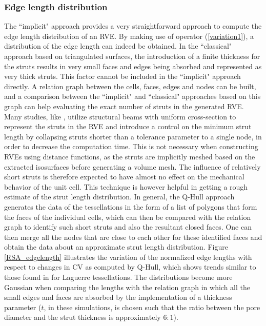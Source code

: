 \subsubsection{Edge length distribution}
The  ``implicit" approach provides a very straightforward approach to compute the edge length distribution of an RVE. By making use of operator (\ref{variation1}), a distribution of the edge length can indeed be obtained. In the ``classical" approach based on triangulated surfaces, the introduction of a finite thickness for the struts results in very small faces and edges being absorbed and represented as very thick struts. This factor cannot be included in the ``implicit" approach directly. A relation graph between the cells, faces, edges and nodes can be built, and a comparison between the ``implicit" and ``classical" approaches based on this graph can help evaluating the exact number of struts in the generated RVE. 
Many studies, like \cite{vanderburgLinearElasticProperties1997,kanaunMechanicalPropertiesOpen2006}, utilize structural beams with uniform cross-section to represent the struts in the RVE and introduce a control on the minimum strut length by collapsing struts shorter than a tolerance parameter to a single node, in order to decrease the computation time. This is not necessary when constructing RVEs using distance functions, as the struts are implicitly meshed based on the extracted isosurfaces before generating a volume mesh. The influence of relatively short struts is therefore expected to have almost no effect on the mechanical behavior of the unit cell. This technique is however helpful in getting a rough estimate of the strut length distribution. In general, the Q-Hull approach generates the data of the tessellations in the form of a list of polygons that form the faces of the individual cells, which can then be compared with the relation graph to identify such short struts and also the resultant closed faces. One can then merge all the nodes that are close to each other for these identified faces and obtain the data about an approximate strut length distribution. Figure \ref{RSA_edgelength} illustrates the variation of the normalized edge lengths with respect to changes in CV as computed by Q-Hull, which shows trends similar to those found in \cite{vecchioImprovedModelsSolid2016} for Laguerre tessellations. The distributions become more Gaussian when comparing the lengths with the relation graph in which all the small edges and faces are absorbed by the implementation of a thickness parameter ($ t $, in these simulations, is chosen such that the ratio between the pore diameter and the strut thickness is approximately $ 6:1 $). 

